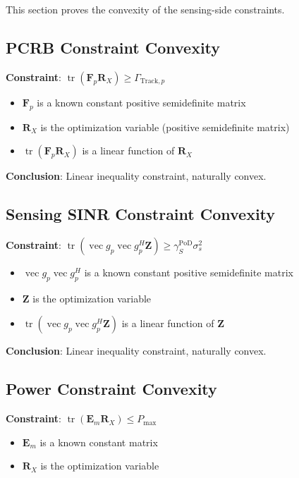 \documentclass[12pt,a4paper]{article}
\DeclareMathOperator{\tr}{tr}
\DeclareMathOperator{\vect}{vec}
\newcommand{\mat}[1]{\mathbf{#1}}
\begin{document}
This section proves the convexity of the sensing-side constraints.

\subsection{PCRB Constraint Convexity}

\textbf{Constraint}: $\tr(\mat{F}_p \mat{R}_X) \geq \Gamma_{\text{Track},p}$

\begin{itemize}
    \item $\mat{F}_p$ is a known constant positive semidefinite matrix
    \item $\mat{R}_X$ is the optimization variable (positive semidefinite matrix)
    \item $\tr(\mat{F}_p \mat{R}_X)$ is a linear function of $\mat{R}_X$
\end{itemize}

\textbf{Conclusion}: Linear inequality constraint, naturally convex.

\subsection{Sensing SINR Constraint Convexity}

\textbf{Constraint}: $\tr(\vect{g}_p \vect{g}_p^H \mat{Z}) \geq \gamma_S^{\text{PoD}} \sigma_s^2$

\begin{itemize}
    \item $\vect{g}_p \vect{g}_p^H$ is a known constant positive semidefinite matrix
    \item $\mat{Z}$ is the optimization variable
    \item $\tr(\vect{g}_p \vect{g}_p^H \mat{Z})$ is a linear function of $\mat{Z}$
\end{itemize}

\textbf{Conclusion}: Linear inequality constraint, naturally convex.

\subsection{Power Constraint Convexity}

\textbf{Constraint}: $\tr(\mat{E}_m \mat{R}_X) \leq P_{\max}$

\begin{itemize}
    \item $\mat{E}_m$ is a known constant matrix
    \item $\mat{R}_X$ is the optimization variable
\end{itemize}
\end{document}
